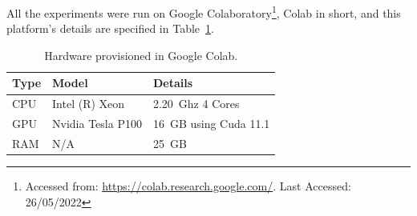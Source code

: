 All the experiments were run on Google Colaboratory\footnote{Accessed from: \url{https://colab.research.google.com/}. Last Accessed: 26/05/2022}, Colab in short, and this platform's details are specified in Table~\ref{tab:hardware}.

\begin{table}
    \centering
    \begin{tabular}{@{}lll@{}}
        \hline
        \textbf{Type} & \textbf{Model} & \textbf{Details} \\
        \hline
        CPU & Intel (R) Xeon & 2.20~Ghz 4 Cores \\
        GPU & Nvidia Tesla P100 & 16~GB using Cuda 11.1 \\
        RAM & N/A & 25~GB \\
        \hline
    \end{tabular}
    \caption{Hardware provisioned in Google Colab.}
    \label{tab:hardware}
\end{table}
